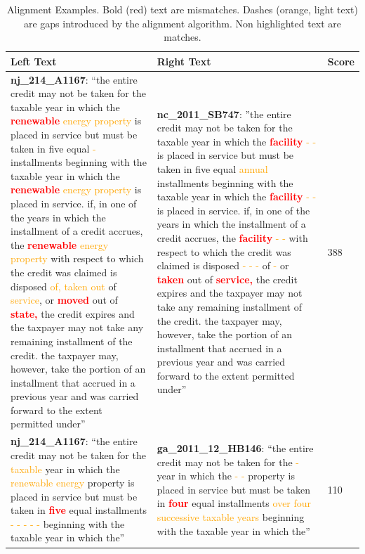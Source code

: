 \documentclass[12pt]{article} %
\begin{document}
\begin{table}[ht!]
\centering
\footnotesize
\caption{Alignment Examples. Bold (red) text are mismatches. Dashes (orange,
light text) are  gaps introduced by the alignment algorithm. Non highlighted
text are matches.}
\label{tab:alignment_examples}
\bgroup
\def\arraystretch{2}
\begin{tabular}{p{}|p{}|p{}}
Left Text & Right Text & Score\\
\hline
\textbf{nj\_214\_A1167}: ``the entire credit may not be taken for the taxable
year in which the \textcolor{red}{\textbf{renewable}} \textcolor{orange}{energy
property} is placed in service but must be taken in five equal
\textcolor{orange}{-} installments beginning with the taxable year in which the
\textcolor{red}{\textbf{renewable}} \textcolor{orange}{energy property} is
placed in service. if, in one of the years in which the installment of a credit
accrues, the \textcolor{red}{\textbf{renewable}} \textcolor{orange}{energy
property} with respect to which the credit was claimed is disposed
\textcolor{orange}{of, taken out} of \textcolor{orange}{service}, or
\textcolor{red}{\textbf{moved}} out of \textcolor{red}{\textbf{state,}} the
credit expires and the taxpayer may not take any remaining installment of the
credit. the taxpayer may, however, take the portion of an installment that
accrued in a previous year and was carried forward to the extent permitted
under'' & \textbf{nc\_2011\_SB747}: ''the entire credit may not be taken for the
taxable year in which the \textcolor{red}{\textbf{facility}}
\textcolor{orange}{- -} is placed in service but must be taken in five equal
\textcolor{orange}{annual} installments beginning with the taxable year in
which the \textcolor{red}{\textbf{facility}} \textcolor{orange}{- -} is placed
in service. if, in one of the years in which the installment of a credit
accrues, the \textcolor{red}{\textbf{facility}} \textcolor{orange}{- -} with
respect to which the credit was claimed is disposed \textcolor{orange}{- - -} of
\textcolor{orange}{-} or \textcolor{red}{\textbf{taken}} out of 
\textcolor{red}{\textbf{service,}} the credit expires and the
taxpayer may not take any remaining installment of the credit. the taxpayer may,
however, take the portion of an installment that accrued in a previous year and
was carried forward to the extent permitted under'' & $388$ \\

\textbf{nj\_214\_A1167}: ``the entire credit may not be taken for the
\textcolor{orange}{taxable} year in which the
\textcolor{orange}{renewable energy} property is placed in service but
must be taken in \textcolor{red}{\textbf{five}} equal installments
\textcolor{orange}{- - - - -} beginning with the taxable year in which the'' &
\textbf{ga\_2011\_12\_HB146}: ``the entire credit may not be taken for the
\textcolor{orange}{-} year in which the \textcolor{orange}{- -} property is
placed in service but must be taken in \textcolor{red}{\textbf{four}} equal
installments \textcolor{orange}{over four successive taxable years}
beginning with the taxable year in which the'' & 110 \\


\end{tabular}
\end{table}
\end{document}
